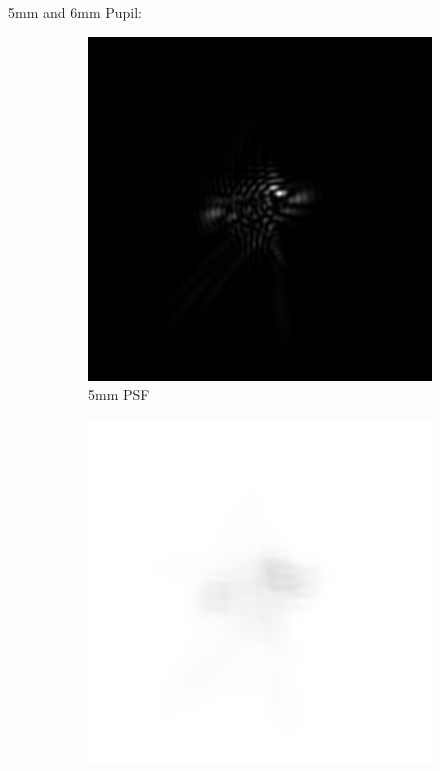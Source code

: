 \documentclass{article}
\begin{document}
5mm and 6mm Pupil:
\begin{figure}[H]
\begin{subfigure}{.25\textwidth}
  \centering
  \includegraphics[width=1\linewidth]{Vasha_R_G_0530_2_500_zer_0_5_PSF.png}
  \caption{5mm PSF}
  \label{fig:5mmStrehlpsf}
\end{subfigure}%
\begin{subfigure}{.25\textwidth}
  \centering
  \includegraphics[width=1\linewidth]{Vasha_R_G_0530_2_500_zer_0_5_PSF_convE.png}

\end{subfigure}
\end{figure}
\end{document}
